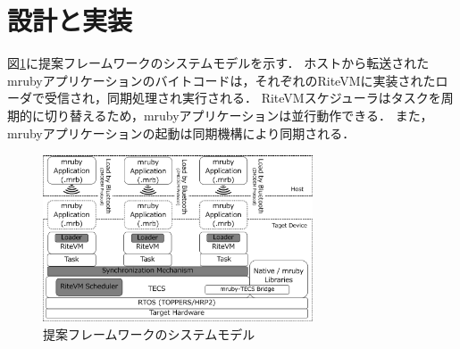 \documentclass[submit,techrep]{ipsj}
\begin{document}
%
%
%
\vspace{-2mm}
\section{設計と実装}
\vspace{-2mm}
\label{sec:Design and Implementation}
図\ref{fig:system_model}に提案フレームワークのシステムモデルを示す．
ホストから転送されたmrubyアプリケーションのバイトコードは，それぞれのRiteVMに実装されたローダで受信され，同期処理され実行される．
RiteVMスケジューラはタスクを周期的に切り替えるため，mrubyアプリケーションは並行動作できる．
また，mrubyアプリケーションの起動は同期機構により同期される．　
\begin{figure}[t]
    \centering
    \includegraphics[width=8cm,clip]{../EMSOFT2016/figure/system_model.pdf}
    \vspace{-2mm}
    \caption{提案フレームワークのシステムモデル}
\vspace{-3mm}
    \label{fig:system_model}
\end{figure}
\vspace{-3mm}
\end{document}
